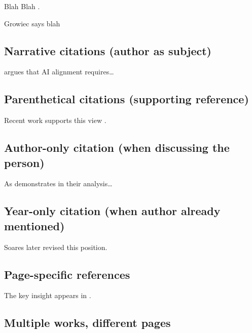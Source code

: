 \documentclass[
  11pt,
  letterpaper,
]{book}
\begin{document}
Blah Blah \autocite{growiec2024,knuth1984}.

Growiec says blah \autocite*{growiec2024}

\subsection*{Narrative citations (author as
subject)}\label{narrative-citations-author-as-subject}

\textcite{soares2014} argues that AI alignment requires\ldots{}

\subsection*{Parenthetical citations (supporting
reference)}\label{parenthetical-citations-supporting-reference}

Recent work supports this view \autocite{soares2014,knuth1984}.

\subsection*{Author-only citation (when discussing the
person)}\label{author-only-citation-when-discussing-the-person}

As \autocite*{soares2014} demonstrates in their analysis\ldots{}

\subsection*{Year-only citation (when author already
mentioned)}\label{year-only-citation-when-author-already-mentioned}

Soares \autocite*{soares2014} later revised this position.

\subsection*{Page-specific references}\label{page-specific-references}

The key insight appears in \autocite[45-67]{soares2014}.

\subsection*{Multiple works, different
pages}\label{multiple-works-different-pages}
\end{document}
